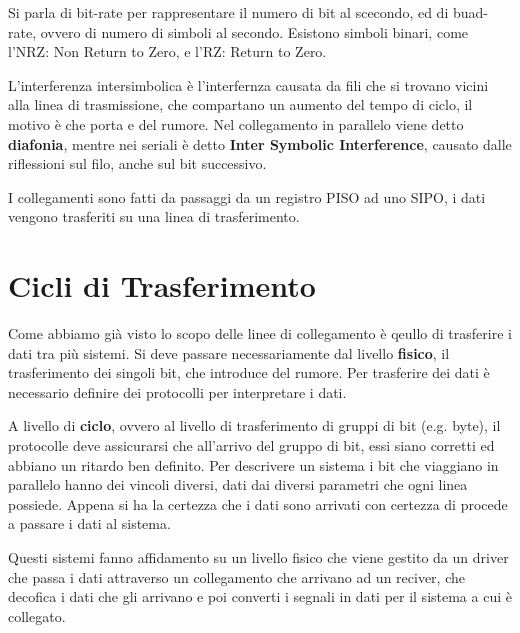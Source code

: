 \documentclass[12pt]{article}
\begin{document}
 Si parla di bit-rate per rappresentare il numero di bit al scecondo, ed di buad-rate, ovvero di numero di simboli al secondo. Esistono simboli binari, come l'NRZ: Non Return to Zero, e l'RZ: Return to Zero.

 L'interferenza intersimbolica \`e l'interfernza causata da fili che si trovano vicini alla linea di trasmissione, che compartano un aumento del tempo di ciclo, il motivo \`e che porta e del rumore. Nel collegamento in parallelo viene detto \textbf{diafonia}, mentre nei seriali \`e detto \textbf{Inter Symbolic Interference}, causato dalle riflessioni sul filo, anche sul bit successivo. 

 I collegamenti sono fatti da passaggi da un registro PISO ad uno SIPO, i dati vengono trasferiti su una linea di trasferimento.


















\newpage
\section{Cicli di Trasferimento}
Come abbiamo gi\`a visto lo scopo delle linee di collegamento \`e qeullo di trasferire i dati tra pi\`u sistemi. Si deve passare necessariamente dal livello \textbf{fisico}, il trasferimento dei singoli bit, che introduce del rumore. Per trasferire dei dati \`e necessario definire dei protocolli per interpretare i dati.

A livello di \textbf{ciclo}, ovvero al livello di trasferimento di gruppi di bit (e.g. byte), il protocolle deve assicurarsi che all'arrivo del gruppo di bit, essi siano corretti ed abbiano un ritardo ben definito. Per descrivere un sistema i bit che viaggiano in parallelo hanno dei vincoli diversi, dati dai diversi parametri che ogni linea possiede. Appena si ha la certezza che i dati sono arrivati con certezza di procede a passare i dati al sistema.

Questi sistemi fanno affidamento su un livello fisico che viene gestito da un driver che passa i dati attraverso un collegamento che arrivano ad un reciver, che decofica i dati che gli arrivano e poi converti i segnali in dati per il sistema a cui \`e collegato.




\newpage
\end{document}
